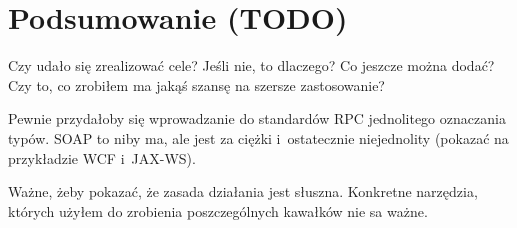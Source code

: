 \chapter{Podsumowanie (TODO)}
Czy udało się zrealizować cele? Jeśli nie, to dlaczego? Co jeszcze można dodać? Czy to, co zrobiłem ma jakąś szansę na szersze zastosowanie?

Pewnie przydałoby się wprowadzanie do standardów RPC jednolitego oznaczania typów. SOAP to niby ma, ale jest za ciężki i~ostatecznie niejednolity (pokazać na przykładzie WCF i~JAX-WS).

Ważne, żeby pokazać, że zasada działania jest słuszna. Konkretne narzędzia, których użyłem do zrobienia poszczególnych kawałków nie sa ważne.

%


